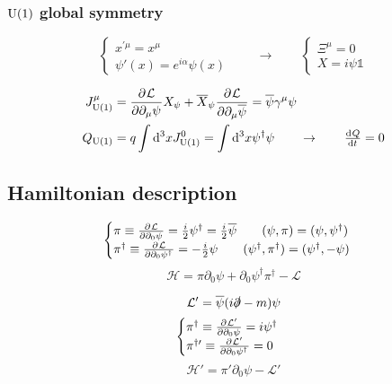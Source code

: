 \subsubsection{$\operatorname{U}(1)$ global symmetry}
\[ \begin{cases}
x^{\prime\mu} = x^\mu \\ \psi'(x)=e^{i\alpha}\psi(x)
\end{cases} \qquad \to \qquad \begin{cases}
\Xi^\mu = 0 \\ X = i\psi\mathbb{1}
\end{cases} \]

\begin{align*}
J^\mu_{\U(1)} &= \pd{\mathcal{L}}{\partial_\mu\psi}X_\psi + \overline{X}_\psi \pd{\mathcal{L}}{\partial_\mu\overline{\psi}} = \overline{\psi}\gamma^\mu\psi \\
Q_{\U(1)} &= q \int \diff{^3x}J^0_{\U(1)} = \int \diff{^3x}\psi^\dagger\psi \qquad \to \qquad \od{Q}{t} = 0
\end{align*}

\subsection{Hamiltonian description}
\[ \begin{cases}
\pi \equiv  \frac{\partial{^{}}\mathcal{L}}{\partial{{\partial_0\psi}^{}}}  = \frac{i}{2}\psi^\dagger = \frac{i}{2}\overline{\psi} \qquad (\psi,\pi) = (\psi,\psi^\dagger) \\
\pi^\dagger \equiv  \frac{\partial{^{}}\mathcal{L}}{\partial{{\partial_0\psi^\dagger}^{}}}  = - \frac{i}{2}\psi \qquad	(\psi^\dagger,\pi^\dagger) = (\psi^\dagger, -\psi)
\end{cases} \]
\[ \mathcal{H} = \pi\partial_0\psi + \partial_0\psi^\dagger\pi^\dagger - \mathcal{L} \]

\[\mathcal{L}' = \overline{\psi}(i\slashed{\partial}-m)\psi\]
\[ \begin{cases}
\pi^\dagger \equiv  \frac{\partial{^{}}\mathcal{L'}}{\partial{{\partial_0\psi}^{}}}  = i\psi^\dagger \\
\pi^{\dagger\prime} \equiv  \frac{\partial{^{}}\mathcal{L}'}{\partial{{\partial_0\psi^\dagger}^{}}}  = 0
\end{cases} \]
\[ \mathcal{H}' = \pi'\partial_0\psi - \mathcal{L}' \]


